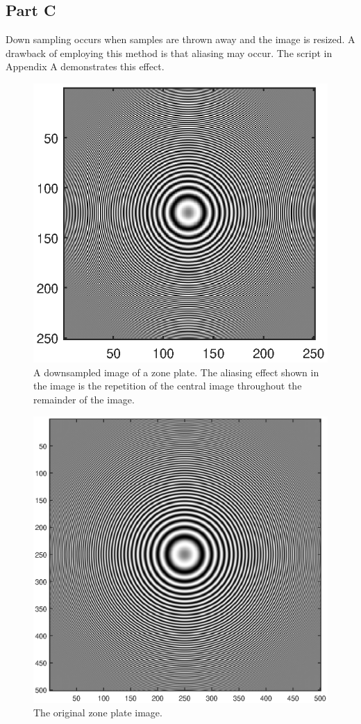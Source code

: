 \documentclass{article}
\begin{document}
\subsection{Part C}
Down sampling occurs when samples are thrown away and the image is resized. A drawback of employing this method is that aliasing may occur. The script in Appendix A demonstrates this effect.

\begin{figure}[H]
	\centering
	\includegraphics[scale=1.2]{fig5}
	\caption{A downsampled image of a zone plate. The aliasing effect shown in the image is the repetition of the central image throughout the remainder of the image.}
\end{figure}

\begin{figure}[H]
	\hspace{-2cm}
	\includegraphics[scale=1.2]{fig4}
	\caption{The original zone plate image.}
\end{figure}
\end{document}

